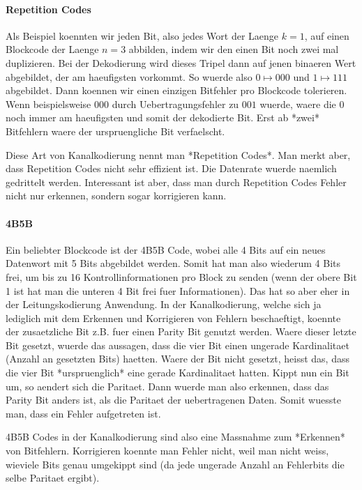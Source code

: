 \paragraph{ Repetition Codes}

Als Beispiel koennten wir jeden Bit, also jedes Wort der Laenge $k = 1$, auf
einen Blockcode der Laenge $n = 3$ abbilden, indem wir den einen Bit noch zwei
mal duplizieren. Bei der Dekodierung wird dieses Tripel dann auf jenen binaeren
Wert abgebildet, der am haeufigsten vorkommt. So wuerde also $0 \mapsto 000$ und
$1 \mapsto 111$ abgebildet. Dann koennen wir einen einzigen Bitfehler pro
Blockcode tolerieren. Wenn beispielsweise $000$ durch Uebertragungsfehler zu
$001$ wuerde, waere die $0$ noch immer am haeufigsten und somit der dekodierte
Bit. Erst ab *zwei* Bitfehlern waere der urspruengliche Bit verfaelscht.

Diese Art von Kanalkodierung nennt man *Repetition Codes*. Man merkt aber, dass
Repetition Codes nicht sehr effizient ist. Die Datenrate wuerde naemlich
gedrittelt werden. Interessant ist aber, dass man durch Repetition Codes Fehler
nicht nur erkennen, sondern sogar korrigieren kann.

\paragraph{ 4B5B}

Ein beliebter Blockcode ist der 4B5B Code, wobei alle 4 Bits auf ein neues
Datenwort mit 5 Bits abgebildet werden. Somit hat man also wiederum 4 Bits frei,
um bis zu 16 Kontrollinformationen pro Block zu senden (wenn der obere Bit 1 ist
hat man die unteren 4 Bit frei fuer Informationen). Das hat so aber eher in der
Leitungskodierung Anwendung. In der Kanalkodierung, welche sich ja lediglich mit
dem Erkennen und Korrigieren von Fehlern beschaeftigt, koennte der zusaetzliche
Bit z.B. fuer einen Parity Bit genutzt werden. Waere dieser letzte Bit gesetzt,
wuerde das aussagen, dass die vier Bit einen ungerade Kardinalitaet (Anzahl an
gesetzten Bits) haetten. Waere der Bit nicht gesetzt, heisst das, dass die vier
Bit *urspruenglich* eine gerade Kardinalitaet hatten. Kippt nun ein Bit um, so
aendert sich die Paritaet. Dann wuerde man also erkennen, dass das Parity Bit
anders ist, als die Paritaet der uebertragenen Daten. Somit wuesste man, dass
ein Fehler aufgetreten ist.

4B5B Codes in der Kanalkodierung sind also eine Massnahme zum *Erkennen* von
Bitfehlern. Korrigieren koennte man Fehler nicht, weil man nicht weiss, wieviele
Bits genau umgekippt sind (da jede ungerade Anzahl an Fehlerbits die selbe
Paritaet ergibt).

